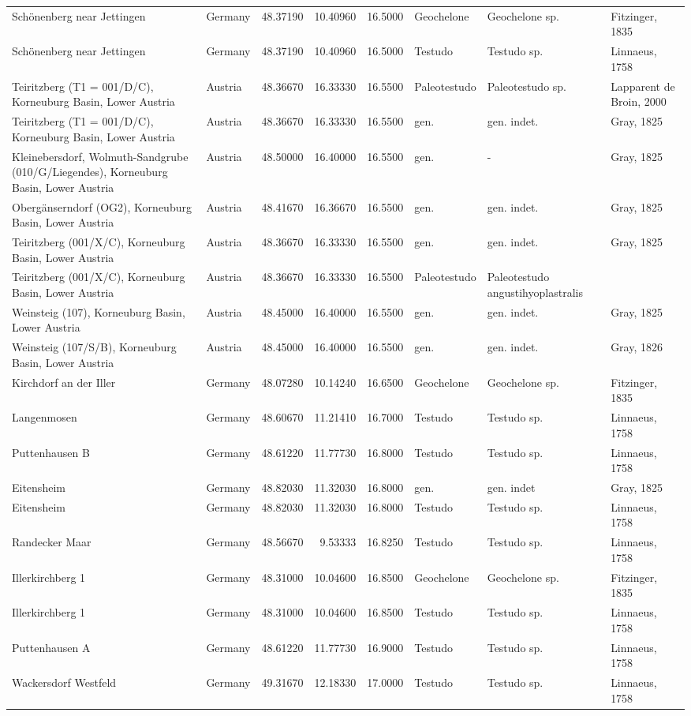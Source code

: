 \documentclass[]{article}
\begin{document}
\begin{longtable}[]{@{}llrrrlll@{}}
Schönenberg near Jettingen & Germany & 48.37190 & 10.40960 & 16.5000 &
Geochelone & Geochelone sp. & Fitzinger, 1835\tabularnewline
Schönenberg near Jettingen & Germany & 48.37190 & 10.40960 & 16.5000 &
Testudo & Testudo sp. & Linnaeus, 1758\tabularnewline
Teiritzberg (T1 = 001/D/C), Korneuburg Basin, Lower Austria & Austria &
48.36670 & 16.33330 & 16.5500 & Paleotestudo & Paleotestudo sp. &
Lapparent de Broin, 2000\tabularnewline
Teiritzberg (T1 = 001/D/C), Korneuburg Basin, Lower Austria & Austria &
48.36670 & 16.33330 & 16.5500 & gen. & gen. indet. & Gray,
1825\tabularnewline
Kleinebersdorf, Wolmuth-Sandgrube (010/G/Liegendes), Korneuburg Basin,
Lower Austria & Austria & 48.50000 & 16.40000 & 16.5500 & gen. & - &
Gray, 1825\tabularnewline
Obergänserndorf (OG2), Korneuburg Basin, Lower Austria & Austria &
48.41670 & 16.36670 & 16.5500 & gen. & gen. indet. & Gray,
1825\tabularnewline
Teiritzberg (001/X/C), Korneuburg Basin, Lower Austria & Austria &
48.36670 & 16.33330 & 16.5500 & gen. & gen. indet. & Gray,
1825\tabularnewline
Teiritzberg (001/X/C), Korneuburg Basin, Lower Austria & Austria &
48.36670 & 16.33330 & 16.5500 & Paleotestudo & Paleotestudo
angustihyoplastralis &\tabularnewline
Weinsteig (107), Korneuburg Basin, Lower Austria & Austria & 48.45000 &
16.40000 & 16.5500 & gen. & gen. indet. & Gray, 1825\tabularnewline
Weinsteig (107/S/B), Korneuburg Basin, Lower Austria & Austria &
48.45000 & 16.40000 & 16.5500 & gen. & gen. indet. & Gray,
1826\tabularnewline
Kirchdorf an der Iller & Germany & 48.07280 & 10.14240 & 16.6500 &
Geochelone & Geochelone sp. & Fitzinger, 1835\tabularnewline
Langenmosen & Germany & 48.60670 & 11.21410 & 16.7000 & Testudo &
Testudo sp. & Linnaeus, 1758\tabularnewline
Puttenhausen B & Germany & 48.61220 & 11.77730 & 16.8000 & Testudo &
Testudo sp. & Linnaeus, 1758\tabularnewline
Eitensheim & Germany & 48.82030 & 11.32030 & 16.8000 & gen. & gen. indet
& Gray, 1825\tabularnewline
Eitensheim & Germany & 48.82030 & 11.32030 & 16.8000 & Testudo & Testudo
sp. & Linnaeus, 1758\tabularnewline
Randecker Maar & Germany & 48.56670 & 9.53333 & 16.8250 & Testudo &
Testudo sp. & Linnaeus, 1758\tabularnewline
Illerkirchberg 1 & Germany & 48.31000 & 10.04600 & 16.8500 & Geochelone
& Geochelone sp. & Fitzinger, 1835\tabularnewline
Illerkirchberg 1 & Germany & 48.31000 & 10.04600 & 16.8500 & Testudo &
Testudo sp. & Linnaeus, 1758\tabularnewline
Puttenhausen A & Germany & 48.61220 & 11.77730 & 16.9000 & Testudo &
Testudo sp. & Linnaeus, 1758\tabularnewline
Wackersdorf Westfeld & Germany & 49.31670 & 12.18330 & 17.0000 & Testudo
& Testudo sp. & Linnaeus, 1758\tabularnewline

\end{longtable}
\end{document}
